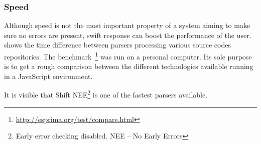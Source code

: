 \subsubsection{Speed} Although speed is not the most important property of a system aiming to make sure no errors are present, swift response can boost the performance of the user.  shows the time difference between parsers processing various source codes repositories. The benchmark~\footnote{\small\url{http://esprima.org/test/compare.html}} was run on a personal computer. Its sole purpose is to get a rough comparison between the different technologies available running in a JavaScript environment.

It is visible that Shift NEE\footnote{Early error checking disabled. NEE -- No Early Errors} is one of the fastest parsers available.

